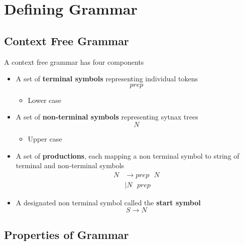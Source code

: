 \chapter{Defining Grammar}

\section{Context Free Grammar}

  A context free grammar has four components

  \begin{itemize}
    \item A set of \textbf{terminal symbols} representing individual tokens
    \begin{equation*}
      prep
    \end{equation*}
    \begin{itemize}
      \item Lower case
    \end{itemize}

    \item A set of \textbf{non-terminal symbols} representing sytnax trees
    \begin{equation*}
      N
    \end{equation*}
    \begin{itemize}
      \item Upper case
    \end{itemize}

    \item A set of \textbf{productions}, each mapping a non terminal symbol
    to string of terminal and non-terminal symbols
    \begin{align*}
      N &\to prep \text{ } N \\
      &\left| N \text{ } prep \right.
    \end{align*}

    \item A designated non terminal symbol called the \textbf{start symbol}
    \begin{equation}
      S \to N
    \end{equation}
  \end{itemize}

\section{Properties of Grammar}

